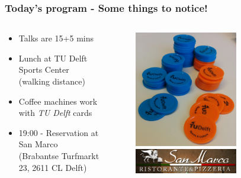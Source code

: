 \documentclass{beamer}
\begin{document}
\begin{frame}
 \frametitle{Today's program - Some things to notice!}
 \begin{columns}
 \begin{column}{0.6\textwidth}
 \begin{itemize}
  \item Talks are {\color{tudblue}15+5 mins}
  \item {\color{tudblue}Lunch} at TU Delft Sports Center (walking distance)
  \item {\color{tudblue}Coffee} machines work with \textit{TU Delft} cards
  \item 19:00 - Reservation at {\color{tudblue}San Marco} (Brabantse Turfmarkt 23, 2611 CL Delft)
 \end{itemize}

 \end{column}

 \begin{column}{0.4\textwidth}
  \begin{figure}[t]
  \includegraphics[width=0.7\textwidth]{pics/money.jpg}\\ \vspace{0.6cm}
  \includegraphics[width=0.7\textwidth]{pics/sanmarco_logo.png}
  \end{figure}
 \end{column}
 \end{columns}
\end{frame}
\end{document}
